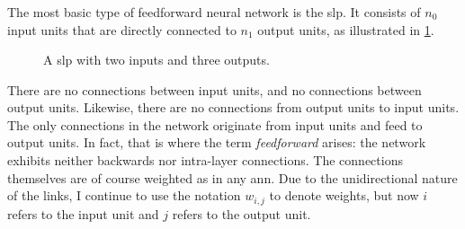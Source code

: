 \documentclass[../report.tex]{subfiles}
\begin{document}
\subsubsection{}
The most basic type of feedforward neural network is the \gls{slp}.
It consists of $n_0$ input units that are directly connected to $n_1$ output units, as illustrated in \cref{fig:slp}.
\begin{figure}
    \centering
    \caption{A \acs{slp} with two inputs and three outputs.}
    \label{fig:slp}
\end{figure}
There are no connections between input units, and no connections between output units.
Likewise, there are no connections from output units to input units. 
The only connections in the network originate from input units and feed to output units. 
In fact, that is where the term \emph{feedforward} arises: the network exhibits neither backwards nor intra-layer connections.
The connections themselves are of course weighted as in any \gls{ann}.
Due to the unidirectional nature of the links, I continue to use the notation $w_{i,j}$ to denote weights, but now $i$ refers to the input unit and $j$ refers to the output unit.
\end{document}
